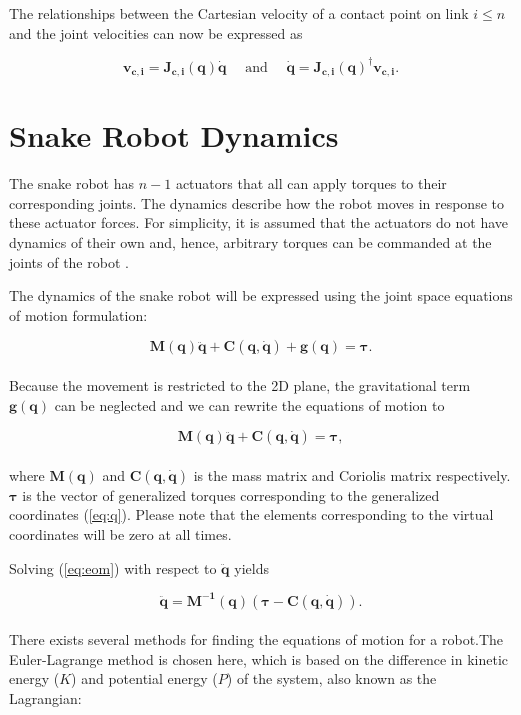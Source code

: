 The relationships between the Cartesian velocity of a contact point on link $i \leq n$ and the joint velocities can now be expressed as

\begin{equation}
    \mathbf{v_{c,i} = J_{c,i}(q) \dot{q}} \quad \textrm{ and } \quad \mathbf{\dot{q} = J_{c,i}(q)^\dagger v_{c,i}}.
\end{equation}



\section{Snake Robot Dynamics} \label{sec:dyn}

The snake robot has $n-1$ actuators that all can apply torques to their corresponding joints. The dynamics describe how the robot moves in response to these actuator forces. For simplicity, it is assumed that the actuators do not have dynamics of their own and, hence, arbitrary torques can be commanded at the joints of the robot \cite{murray2017mathematical}.

The dynamics of the snake robot will be expressed using the joint space equations of motion formulation:

\begin{equation}
    \mathbf{M(q)\ddot{q} + C(q, \dot{q}) + g(q)} = \boldsymbol{\tau}.
\end{equation}
\\
Because the movement is restricted to the 2D plane, the gravitational term $\mathbf{g(q)}$ can be neglected and we can rewrite the equations of motion to

\begin{equation}\label{eq:eom}
    \mathbf{M(q)\ddot{q} + C(q, \dot{q})} = \boldsymbol{\tau},
\end{equation}
\\
where $\mathbf{M(q)}$ and $\mathbf{C(q,\dot{q})}$ is the mass matrix and Coriolis matrix respectively.
$\boldsymbol{\tau}$ is the vector of generalized torques corresponding to the generalized coordinates (\ref{eq:q}). Please note that the elements corresponding to the virtual coordinates will be zero at all times.

Solving (\ref{eq:eom}) with respect to $\mathbf{\ddot{q}}$ yields

\begin{equation}\label{eq:eom_qdd}
    \mathbf{\ddot{q}} = \mathbf{M^{-1}(q)}( \boldsymbol{\tau} - \mathbf{C(q, \dot{q})}).
\end{equation}
\\
There exists several methods for finding the equations of motion for a robot.The Euler-Lagrange method \cite{lynch2017modern} is chosen here, which is based on the difference in kinetic energy ($K$) and potential energy ($P$) of the system, also known as the Lagrangian:

